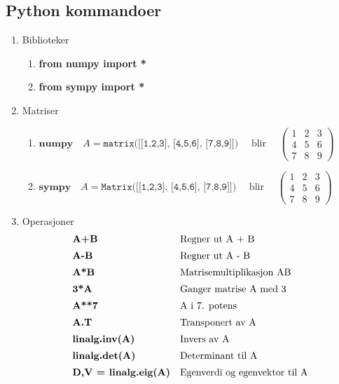 \documentclass{article}
\begin{document}
\subsection*{Python kommandoer}
\begin{enumerate}
    \item Biblioteker
    \begin{enumerate}[]
        \item \textbf{from numpy import *}
        \item \textbf{from sympy import *}
    \end{enumerate}
    \vspace{1em}
    
    \item Matriser
    \begin{enumerate}[]
        \item $\textbf{numpy} \quad A = \texttt{matrix([[1,2,3], [4,5,6], [7,8,9]])}  \quad \text{ blir } \quad \begin{pmatrix} 1 & 2 & 3 \\ 4 & 5 & 6 \\ 7 & 8 & 9 \end{pmatrix}$

        \item $\textbf{sympy} \quad A = \texttt{Matrix([[1,2,3], [4,5,6], [7,8,9]])} \quad \text{ blir } \quad \begin{pmatrix} 1 & 2 & 3 \\ 4 & 5 & 6 \\ 7 & 8 & 9 \end{pmatrix}$
    \end{enumerate}
    \vspace{1em}

    
    \item Operasjoner \\[1em]
    \begin{equation*}
    \begin{array}{l l}
        \textbf{A+B} & \text{Regner ut A + B} \\[0.5em]
        \textbf{A-B} & \text{Regner ut A - B} \\[0.5em]
        \textbf{A*B} & \text{Matrisemultiplikasjon AB} \\[0.5em]
        \textbf{3*A} & \text{Ganger matrise A med 3} \\[0.5em]
        \textbf{A**7} & \text{A i 7. potens} \\[0.5em]
        \textbf{A.T} & \text{Transponert av A} \\[0.5em]
        \textbf{linalg.inv(A)} & \text{Invers av A} \\[0.5em]
        \textbf{linalg.det(A)} & \text{Determinant til A} \\[0.5em]
        \textbf{D,V = linalg.eig(A)} & \text{Egenverdi og egenvektor til A} \\[0.5em]
    \end{array}
    \end{equation*}



\end{enumerate}
\end{document}
